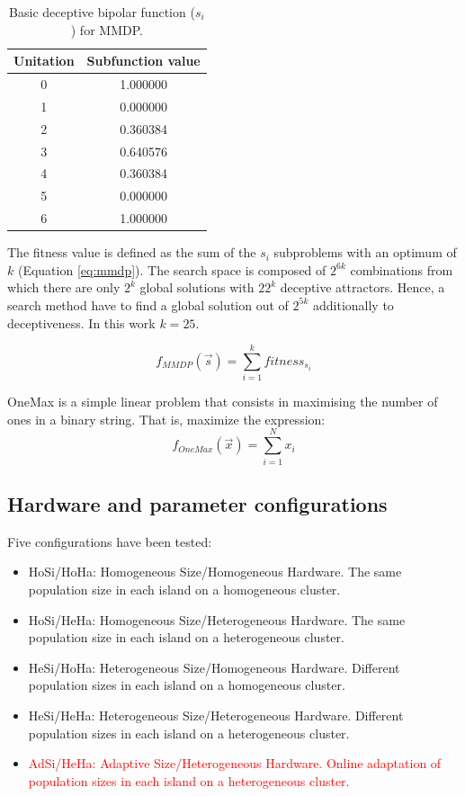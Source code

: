 \documentclass[final,1p,times]{elsarticle}
\begin{document}
\begin{table}

\centering
{\scriptsize
\caption{ Basic deceptive bipolar function ($s_i$) for MMDP.}
\label{table:mmdpvalues}
\begin{tabular}{|c|c|}
\hline
Unitation&Subfunction value\\
\hline
0 & 1.000000 \\
\hline
1 & 0.000000 \\
\hline
2 & 0.360384 \\
\hline
3 & 0.640576\\
\hline
4 & 0.360384\\
\hline
5 & 0.000000\\
\hline
6 & 1.000000\\
\hline

\end{tabular}
}


\end{table}



The fitness value is defined as the sum of the $s_i$ subproblems with an optimum of $k$ (Equation \ref{eq:mmdp}).
The search space is composed of $2^{6k}$ combinations from which there
are only $2^k$ global solutions with $22^k$ deceptive
attractors. Hence, a search method have to find a global solution
out of $2^{5k}$ additionally to deceptiveness. In this work $k=25$. 

\begin{equation}\label{eq:mmdp}
f_{MMDP}(\vec s)= \sum_{i=1}^{k} fitness_{s_i}
\end{equation}

OneMax is a simple linear problem that consists in maximising the number of ones in a binary string. That is, maximize the expression:
\begin{equation}
f_{OneMax}(\vec{x}) = \sum_{i=1}^{N}{x_{i}}
\end{equation}

\subsection{Hardware and parameter configurations}

Five configurations have been tested:

\begin{itemize}
\item HoSi/HoHa: Homogeneous Size/Homogeneous Hardware. The same population size in each island on a homogeneous cluster.
\item HoSi/HeHa: Homogeneous Size/Heterogeneous Hardware. The same population size in each island on a heterogeneous cluster.
\item HeSi/HoHa: Heterogeneous Size/Homogeneous Hardware. Different population sizes in each island on a homogeneous cluster.
\item HeSi/HeHa: Heterogeneous Size/Heterogeneous Hardware. Different population sizes in each island on a heterogeneous cluster.
\item \textcolor{red}{AdSi/HeHa: Adaptive Size/Heterogeneous Hardware. Online adaptation of population sizes in each island on a heterogeneous cluster.}
\end{itemize}
\end{document}
